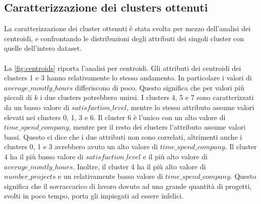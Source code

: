 \documentclass[10pt,a4paper,twocolumn]{report}
\begin{document}
\subsection{Caratterizzazione dei clusters ottenuti}
La caratterizzazione dei cluster ottenuti è stata svolta per mezzo dell'analisi dei centroidi, e confrontando le distribuzioni degli attributi dei singoli cluster con quelle dell'intero dataset.
\paragraph{}
La \autoref{fig:centroids} riporta l'analisi per centroidi. Gli attributi dei centroidi dei clusters 1 e 3 hanno relativamente lo stesso andamento. In particolare i valori di $average\_montly\_hours$ differiscono di poco. Questo significa che per valori più piccoli di $k$ i due clusters potrebbero unirsi. I clusters 4, 5 e 7 sono caratterizzati da un basso valore di $satisfaction\_level$, mentre lo stesso attributo assume valori elevati nei clusters 0, 1, 3 e 6. Il cluster 6 è l'unico con un alto valore di $time\_spend\_company$, mentre per il resto dei clusters l'attributo assume valori bassi. Questo ci dice che i due attributi non sono correlati, altrimenti anche i clusters 0, 1 e 3 avrebbero avuto un alto valore di $time\_spend\_company$. Il cluster 4 ha il più basso valore di $satisfaction\_level$ e il più alto valore di  $average\_montly\_hours$. Inoltre, il cluster 4 ha il più alto valore di $number\_projects$ e un relativamente basso valore di $time\_spend\_company$. Questo significa che il sovraccarico di lavoro dovuto ad una grande quantità di progetti, svolti in poco tempo, porta gli impiegati ad essere infelici.
\end{document}
